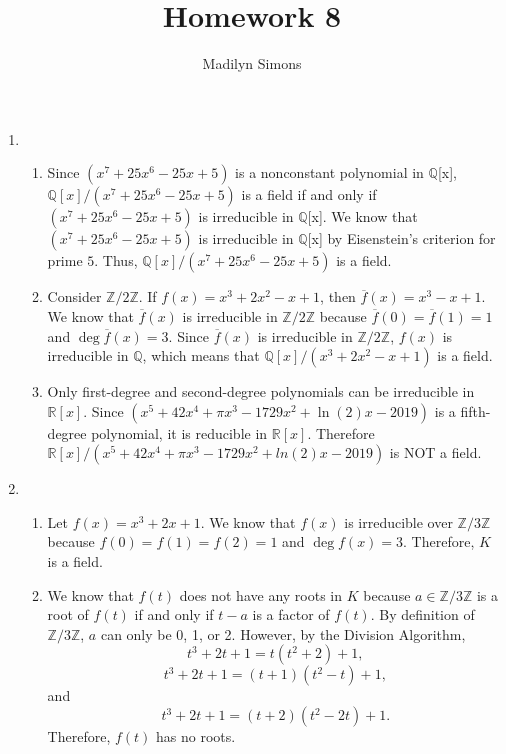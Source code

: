 \documentclass{article}
\title{Homework 8}
\author{Madilyn Simons}
\date{}
\begin{document}
\maketitle

\begin{enumerate}

\item
\begin{enumerate}

\item Since $(x^7 + 25x^6 - 25x + 5)$ is a nonconstant polynomial in
$\mathbb{Q}$[x], $\mathbb{Q}[x]/(x^7 + 25x^6 - 25x + 5)$ is a field if and only if
$(x^7 + 25x^6 - 25x + 5)$ is irreducible in $\mathbb{Q}$[x].  We know that
$(x^7 + 25x^6 - 25x + 5)$ is irreducible in $\mathbb{Q}$[x] by Eisenstein's
criterion for prime $5$.  Thus, $\mathbb{Q}[x]/(x^7 + 25x^6 - 25x + 5)$ is a field.

\item Consider $\mathbb{Z}/2\mathbb{Z}$.  If $f(x) = x^3 + 2x^2 - x + 1$, then
$\overline{f}(x) = x^3 - x + 1$.  We know that $\overline{f}(x)$ is
irreducible in $\mathbb{Z}/2\mathbb{Z}$ because
$\overline{f}(0) = \overline{f}(1) = 1$ and $\deg \overline{f}(x) = 3$.  Since $\overline{f}(x)$ is
irreducible in $\mathbb{Z}/2\mathbb{Z}$, $f(x)$ is irreducible in $\mathbb{Q}$,
which means that $\mathbb{Q}[x]/(x^3 + 2x^2 - x + 1)$ is a field.

\item Only first-degree and second-degree polynomials can be irreducible in
$\mathbb{R}[x]$.  Since $(x^5 + 42x^4 + \pi x^3 -1729x^2 + \ln (2)x - 2019)$
is a fifth-degree polynomial, it is reducible in $\mathbb{R}[x]$.  Therefore
$\mathbb{R}[x]/(x^5 + 42x^4 + \pi x^3 -1729x^2 + ln(2)x - 2019)$ is NOT
a field.

\end{enumerate}

\item
\begin{enumerate}
\item
Let $f(x) = x^3 + 2x + 1$.  We know that $f(x)$ is irreducible over
$\mathbb{Z}/3\mathbb{Z}$ because $f(0) = f(1) = f(2) = 1$ and $\deg f(x) = 3$.
Therefore,
$K$ is a field.
\item
We know that $f(t)$ does not have any roots in $K$ because $a \in \mathbb{Z}/3\mathbb{Z}$
is a root of $f(t)$ if and only if $t-a$ is a factor of $f(t)$.  By definition of
$\mathbb{Z}/3\mathbb{Z}$, $a$ can only be 0, 1, or 2.  However, by the Division
Algorithm,
\[
t^3 + 2t + 1 = t(t^2 + 2) + 1,
\]
\[
t^3 + 2t + 1 = (t+1)(t^2 - t) + 1,
\]
and
\[
t^3 + 2t + 1 = (t+2)(t^2 - 2t) + 1.
\]
Therefore, $f(t)$ has no roots.


\end{enumerate}
\end{enumerate}
\end{document}
